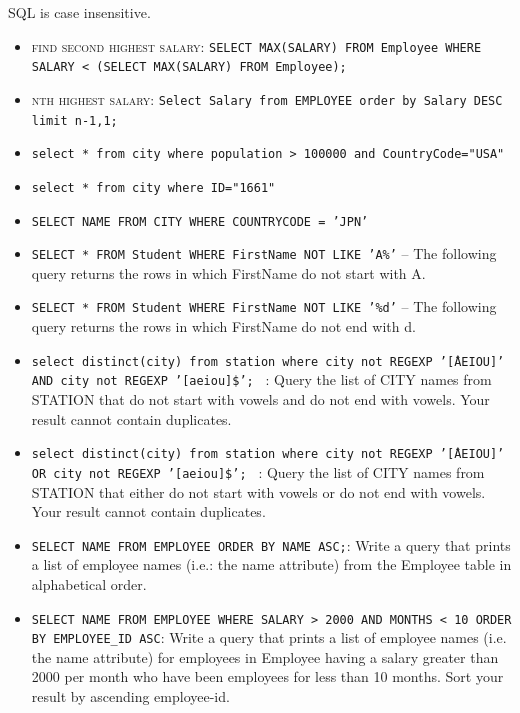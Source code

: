 \documentclass[11pt]{article}
\begin{document}
\begin{itemize}



\end{itemize}

SQL is case insensitive. 

\begin{itemize}
\item \textsc{find second highest salary}:  \texttt{SELECT MAX(SALARY) FROM Employee WHERE SALARY < (SELECT MAX(SALARY) FROM Employee);}
\item \textsc{nth highest salary:} \texttt{Select Salary from EMPLOYEE order by Salary DESC limit n-1,1;} 
\item \texttt{select * from city where population > 100000 and CountryCode="USA"} 
\item \texttt{select * from city where ID="1661"} 
\item \texttt{SELECT NAME FROM CITY WHERE COUNTRYCODE = 'JPN'} 
\item \texttt{SELECT * FROM Student WHERE FirstName NOT LIKE 'A\%'} -- The following query returns the rows in which FirstName do not start with A.
\item \texttt{SELECT * FROM Student WHERE FirstName NOT LIKE '\%d'} -- The following query returns the rows in which FirstName do not end with d.
\item \texttt{select distinct(city) from station where city not REGEXP '\^[AEIOU]' AND city not REGEXP '[aeiou]\$'; } : Query the list of CITY names from STATION that do not start with 
vowels and do not end with vowels. Your result cannot contain duplicates.
\item \texttt{select distinct(city) from station where city not REGEXP '\^[AEIOU]' OR city not REGEXP '[aeiou]\$'; } : Query the list of CITY names from STATION that either do not start with 
vowels or do not end with vowels. Your result cannot contain duplicates.
\item \texttt{SELECT NAME FROM EMPLOYEE ORDER BY NAME ASC;}: Write a query that prints a list of employee names (i.e.: the name attribute) from the Employee table in alphabetical order.
\item \texttt{SELECT NAME FROM EMPLOYEE WHERE SALARY > 2000 AND MONTHS < 10 ORDER BY EMPLOYEE\_ID ASC}: Write a query that prints a list of employee names (i.e. the name attribute) for employees in Employee having a salary greater than  2000 per month who have been employees for less than  10 months. Sort your result by ascending employee-id.

\end{itemize}
\end{document}
